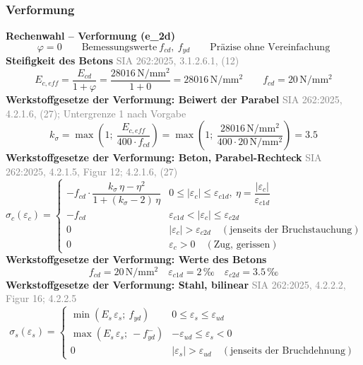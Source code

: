 \documentclass[11pt,a4paper]{article}
\newcommand{\normref}[1]{{\small\textcolor{gray}{#1}}}
\begin{document}
\subsubsection{Verformung}
\noindent\textbf{Rechenwahl – Verformung (e\_2d)}
\begin{equation*}
\varphi = 0 \qquad \text{Bemessungswerte}\ f_{cd},\ f_{yd} \qquad \text{Präzise ohne Vereinfachung}
\end{equation*}
\noindent\textbf{Steifigkeit des Betons} \hfill \normref{SIA 262:2025, 3.1.2.6.1, (12)}
\begin{equation*}
E_{c,eff} = \frac{E_{cd}}{1 + \varphi} = \frac{28016\,\mathrm{N}/\mathrm{mm}^{2}}{1 + 0} = 28016\,\mathrm{N}/\mathrm{mm}^{2} \qquad f_{cd} = 20\,\mathrm{N}/\mathrm{mm}^{2}
\end{equation*}
\noindent\textbf{Werkstoffgesetze der Verformung: Beiwert der Parabel} \hfill \normref{SIA 262:2025, 4.2.1.6, (27); Untergrenze 1 nach Vorgabe}
\begin{equation*}
k_{\sigma} = \max\left(1;\ \frac{E_{c,eff}}{400 \cdot f_{cd}}\right) = \max\left(1;\ \frac{28016\,\mathrm{N}/\mathrm{mm}^{2}}{400 \cdot 20\,\mathrm{N}/\mathrm{mm}^{2}}\right) = 3.5
\end{equation*}
\noindent\textbf{Werkstoffgesetze der Verformung: Beton, Parabel-Rechteck} \hfill \normref{SIA 262:2025, 4.2.1.5, Figur 12; 4.2.1.6, (27)}
\begin{equation*}
\sigma_c(\varepsilon_c) = \begin{cases} -f_{cd} \cdot \dfrac{k_\sigma\,\eta - \eta^2}{1 + (k_\sigma - 2)\,\eta} & 0 \le |\varepsilon_c| \le \varepsilon_{c1d},\ \eta = \dfrac{|\varepsilon_c|}{\varepsilon_{c1d}} \\[2ex] -f_{cd} & \varepsilon_{c1d} < |\varepsilon_c| \le \varepsilon_{c2d} \\[1ex] 0 & |\varepsilon_c| > \varepsilon_{c2d} \quad (\text{jenseits der Bruchstauchung}) \\[1ex] 0 & \varepsilon_c > 0 \quad (\text{Zug, gerissen}) \end{cases}
\end{equation*}
\noindent\textbf{Werkstoffgesetze der Verformung: Werte des Betons}
\begin{equation*}
f_{cd} = 20\,\mathrm{N}/\mathrm{mm}^{2} \quad \varepsilon_{c1d} = 2\,\text{‰} \quad \varepsilon_{c2d} = 3.5\,\text{‰}
\end{equation*}
\noindent\textbf{Werkstoffgesetze der Verformung: Stahl, bilinear} \hfill \normref{SIA 262:2025, 4.2.2.2, Figur 16; 4.2.2.5}
\begin{equation*}
\sigma_s(\varepsilon_s) = \begin{cases} \min(E_s\,\varepsilon_s;\ f_{yd}) & 0 \le \varepsilon_s \le \varepsilon_{ud} \\[1ex] \max(E_s\,\varepsilon_s;\ -f_{yd}^{-}) & -\varepsilon_{ud} \le \varepsilon_s < 0 \\[1ex] 0 & |\varepsilon_s| > \varepsilon_{ud} \quad (\text{jenseits der Bruchdehnung}) \end{cases}
\end{equation*}
\end{document}
